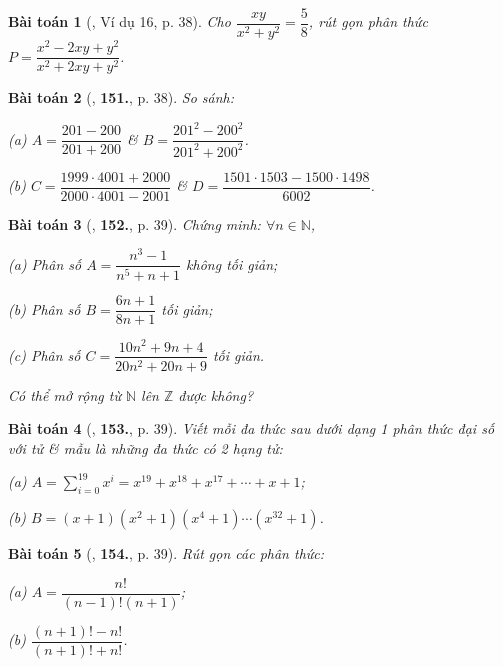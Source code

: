 \documentclass{article}
\numberwithin{equation}{section}
\newtheorem{baitoan}{Bài toán}[section]
\begin{document}
\begin{baitoan}[\cite{Tuyen_Toan_8}, Ví dụ 16, p. 38]
	Cho $\dfrac{xy}{x^2 + y^2} = \dfrac{5}{8}$, rút gọn phân thức $P = \dfrac{x^2 - 2xy + y^2}{x^2 + 2xy + y^2}$.
\end{baitoan}

\begin{baitoan}[\cite{Tuyen_Toan_8}, \textbf{151.}, p. 38]
	So sánh:
	\begin{enumerate*}
		\item[(a)] $A = \dfrac{201 - 200}{201 + 200}$ \& $B = \dfrac{201^2 - 200^2}{201^2 + 200^2}$.
		\item[(b)] $C = \dfrac{1999\cdot 4001 + 2000}{2000\cdot 4001 - 2001}$ \& $D = \dfrac{1501\cdot 1503 - 1500\cdot 1498}{6002}$.
	\end{enumerate*}
\end{baitoan}

\begin{baitoan}[\cite{Tuyen_Toan_8}, \textbf{152.}, p. 39]
	Chứng minh: $\forall n\in\mathbb{N}$,
	\begin{enumerate*}
		\item[(a)] Phân số $A = \dfrac{n^3 - 1}{n^5 + n + 1}$ không tối giản;
		\item[(b)] Phân số $B = \dfrac{6n + 1}{8n + 1}$ tối giản;
		\item[(c)] Phân số $C = \dfrac{10n^2 + 9n + 4}{20n^2 + 20n + 9}$ tối giản.
	\end{enumerate*}
	Có thể mở rộng từ $\mathbb{N}$ lên $\mathbb{Z}$ được không?
\end{baitoan}

\begin{baitoan}[\cite{Tuyen_Toan_8}, \textbf{153.}, p. 39]
	Viết mỗi đa thức sau dưới dạng 1 phân thức đại số với tử \& mẫu là những đa thức có 2 hạng tử:
	\begin{enumerate*}
		\item[(a)] $A = \sum_{i=0}^{19} x^i = x^{19} + x^{18} + x^{17} + \cdots + x + 1$;
		\item[(b)] $B = (x + 1)(x^2 + 1)(x^4 + 1)\cdots(x^{32} + 1)$.
	\end{enumerate*}
\end{baitoan}

\begin{baitoan}[\cite{Tuyen_Toan_8}, \textbf{154.}, p. 39]
	Rút gọn các phân thức:
	\begin{enumerate*}
		\item[(a)] $A = \dfrac{n!}{(n - 1)!(n + 1)}$;
		\item[(b)] $\dfrac{(n + 1)! - n!}{(n + 1)! + n!}$.
	\end{enumerate*}
\end{baitoan}
\end{document}
